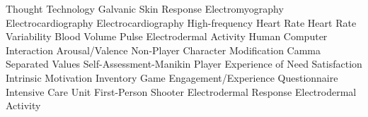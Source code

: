    {Thought Technology}
  {Galvanic Skin Response}
  {Electromyography}
  {Electrocardiography}
  {Electrocardiography}
   {High-frequency}
   {Heart Rate}
  {Heart Rate Variability}
  {Blood Volume Pulse}
  {Electrodermal Activity}
  {Human Computer Interaction}
   {Arousal/Valence}
  {Non-Player Character}
  {Modification}
  {Camma Separated Values}
  {Self-Assessment-Manikin}
 {Player Experience of Need Satisfaction}
  {Intrinsic Motivation Inventory}
  {Game Engagement/Experience Questionnaire}
  {Intensive Care Unit}
  {First-Person Shooter}
  {Electrodermal Response}
  {Electrodermal Activity}
